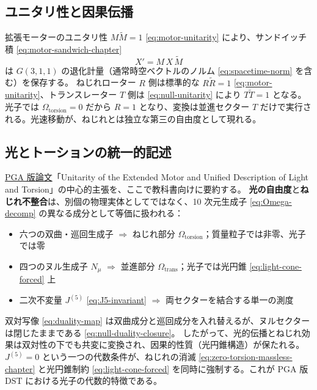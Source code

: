 \documentclass[dvipdfmx,a4paper,oneside]{jsbook}
\numberwithin{equation}{chapter}
\begin{document}
\subsection{ユニタリ性と因果伝播}

拡張モーターのユニタリ性 \(M\widetilde{M} = 1\) \eqref{eq:motor-unitarity} により、サンドイッチ積 \eqref{eq:motor-sandwich-chapter}
\begin{equation}
  X' = M\,X\,\widetilde{M}
\end{equation}
は \(G(3,1,1)\) の退化計量（通常時空ベクトルのノルム \eqref{eq:spacetime-norm} を含む）を保存する。
ねじれローター \(R\) 側は標準的な \(R\widetilde{R} = 1\) \eqref{eq:motor-unitarity}、トランスレーター \(T\) 側は \eqref{eq:null-unitarity} により \(T\widetilde{T} = 1\) となる。
光子では \(\Omega_{\mathrm{torsion}} = 0\) だから \(R = 1\) となり、変換は並進セクター \(T\) だけで実行される。光速移動が、ねじれとは独立な第三の自由度として現れる。

\subsection{光とトーションの統一的記述}

\hyperref[sec:sister-manuscripts]{PGA 版論文}「Unitarity of the Extended Motor and Unified Description of Light and Torsion」の中心的主張を、ここで教科書向けに要約する。
\textbf{光の自由度}と\textbf{ねじれ不整合}は、別個の物理実体としてではなく、10 次元生成子 \eqref{eq:Omega-decomp} の異なる成分として等価に扱われる：

\begin{itemize}[leftmargin=2em]
  \item 六つの双曲・巡回生成子 \(\Rightarrow\) ねじれ部分 \(\Omega_{\mathrm{torsion}}\)；質量粒子では非零、光子では零
  \item 四つのヌル生成子 \(N_\mu\) \(\Rightarrow\) 並進部分 \(\Omega_{\mathrm{trans}}\)；光子では光円錐 \eqref{eq:light-cone-forced} 上
  \item 二次不変量 \(J^{(5)}\) \eqref{eq:J5-invariant} \(\Rightarrow\) 両セクターを結合する単一の測度
\end{itemize}

双対写像 \eqref{eq:duality-map} は双曲成分と巡回成分を入れ替えるが、ヌルセクターは閉じたままである \eqref{eq:null-duality-closure}。
したがって、光的伝播とねじれ効果は双対性の下でも共変に変換され、因果的性質（光円錐構造）が保たれる。
\(J^{(5)} = 0\) という一つの代数条件が、ねじれの消滅 \eqref{eq:zero-torsion-massless-chapter} と光円錐制約 \eqref{eq:light-cone-forced} を同時に強制する。これが PGA 版 DST における光子の代数的特徴である。
\end{document}
